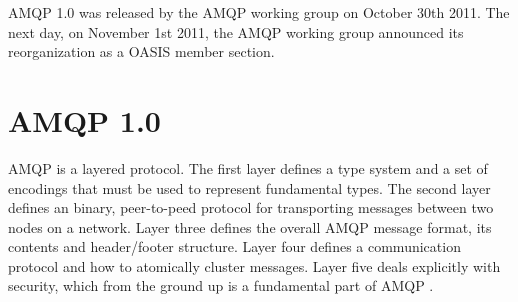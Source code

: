 \documentclass{thesis}
\begin{document}

AMQP 1.0 was released by the AMQP working group on October 30th 2011.  The next day, on November 1st 2011, the AMQP working group announced its reorganization as a OASIS member section. \cite{AMQP}

\section{AMQP 1.0}

AMQP is a layered protocol.  The first layer defines a type system and a set of encodings that must be used to represent fundamental types.  The second layer defines an binary, peer-to-peed protocol for transporting messages between two nodes on a network.  Layer three defines the overall AMQP message format, its contents and header/footer structure.  Layer four defines a communication protocol and how to atomically cluster messages.  Layer five deals explicitly with security, which from the ground up is a fundamental part of AMQP \cite{AMQP1.0}. 
\end{document}
